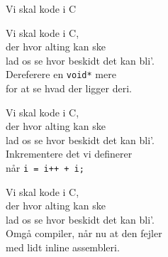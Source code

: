 \begin{song}{Vi skal kode i C}
\begin{SBChorus}
  Vi skal kode i C, \\
  der hvor alting kan ske \\
  lad os se hvor beskidt det kan bli'. \\
  Dereferere en \texttt{void*} mere \\
  for at se hvad der ligger deri. \\
\end{SBChorus}

\bigskip

\begin{SBChorus}
  Vi skal kode i C, \\
  der hvor alting kan ske \\
  lad os se hvor beskidt det kan bli'. \\
  Inkrementere det vi definerer \\
  når \texttt{i = i++ + i;}  \\
\end{SBChorus}


\begin{SBChorus}
  Vi skal kode i C, \\
  der hvor alting kan ske \\
  lad os se hvor beskidt det kan bli'. \\
  Omgå compiler, når nu at den fejler \\
  med lidt inline assembleri. \\
\end{SBChorus}

\end{song}